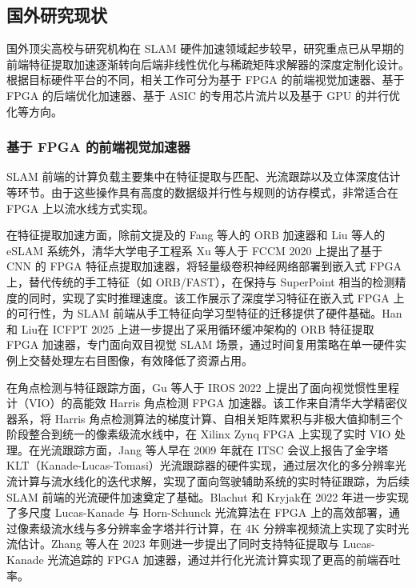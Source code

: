 \subsection{国外研究现状}

国外顶尖高校与研究机构在 SLAM 硬件加速领域起步较早，研究重点已从早期的前端特征提取加速逐渐转向后端非线性优化与稀疏矩阵求解器的深度定制化设计。根据目标硬件平台的不同，相关工作可分为基于 FPGA 的前端视觉加速器、基于 FPGA 的后端优化加速器、基于 ASIC 的专用芯片流片以及基于 GPU 的并行优化等方向。

\subsubsection{基于 FPGA 的前端视觉加速器}

SLAM 前端的计算负载主要集中在特征提取与匹配、光流跟踪以及立体深度估计等环节。由于这些操作具有高度的数据级并行性与规则的访存模式，非常适合在 FPGA 上以流水线方式实现。

在特征提取加速方面，除前文提及的 Fang 等人\cite{fang2017fpga_orb}的 ORB 加速器和 Liu 等人\cite{liu2019eslam}的 eSLAM 系统外，清华大学电子工程系 Xu 等人\cite{xu2020cnn_fpga}于 FCCM 2020 上提出了基于 CNN 的 FPGA 特征点提取加速器，将轻量级卷积神经网络部署到嵌入式 FPGA 上，替代传统的手工特征（如 ORB/FAST），在保持与 SuperPoint 相当的检测精度的同时，实现了实时推理速度。该工作展示了深度学习特征在嵌入式 FPGA 上的可行性，为 SLAM 前端从手工特征向学习型特征的迁移提供了硬件基础。Han 和 Liu\cite{han2025orb_fpga}在 ICFPT 2025 上进一步提出了采用循环缓冲架构的 ORB 特征提取 FPGA 加速器，专门面向双目视觉 SLAM 场景，通过时间复用策略在单一硬件实例上交替处理左右目图像，有效降低了资源占用。

在角点检测与特征跟踪方面，Gu 等人\cite{gu2022harris}于 IROS 2022 上提出了面向视觉惯性里程计（VIO）的高能效 Harris 角点检测 FPGA 加速器。该工作来自清华大学精密仪器系，将 Harris 角点检测算法的梯度计算、自相关矩阵累积与非极大值抑制三个阶段整合到统一的像素级流水线中，在 Xilinx Zynq FPGA 上实现了实时 VIO 处理。在光流跟踪方面，Jang 等人\cite{jang2009klt}早在 2009 年就在 ITSC 会议上报告了金字塔 KLT（Kanade-Lucas-Tomasi）光流跟踪器的硬件实现，通过层次化的多分辨率光流计算与流水线化的迭代求解，实现了面向驾驶辅助系统的实时特征跟踪，为后续 SLAM 前端的光流硬件加速奠定了基础。Blachut 和 Kryjak\cite{blachut2022lk_fpga}在 2022 年进一步实现了多尺度 Lucas-Kanade 与 Horn-Schunck 光流算法在 FPGA 上的高效部署，通过像素级流水线与多分辨率金字塔并行计算，在 4K 分辨率视频流上实现了实时光流估计。Zhang 等人\cite{zhang2023fpga_feature}在 2023 年则进一步提出了同时支持特征提取与 Lucas-Kanade 光流追踪的 FPGA 加速器，通过并行化光流计算实现了更高的前端吞吐率。

